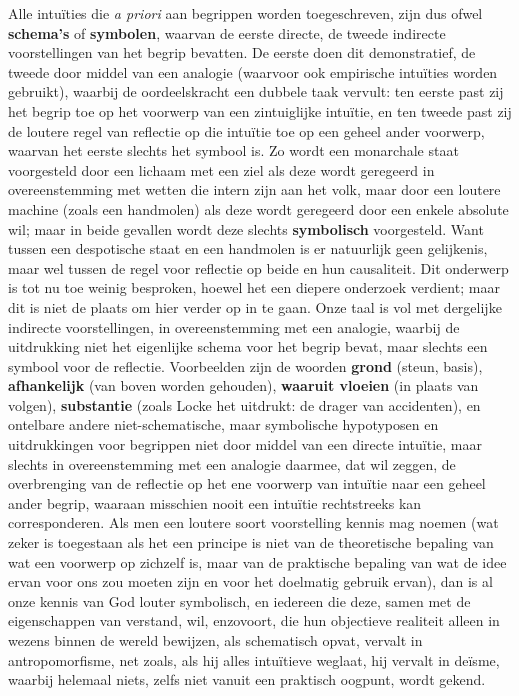 Alle intuïties die \textit{a priori} aan begrippen worden toegeschreven, zijn dus ofwel \textbf{schema's} of \textbf{symbolen}, waarvan de eerste directe, de tweede indirecte voorstellingen van het begrip bevatten. De eerste doen dit demonstratief, de tweede door middel van een analogie (waarvoor ook empirische intuïties worden gebruikt), waarbij de oordeelskracht een dubbele taak vervult: ten eerste past zij het begrip toe op het voorwerp van een zintuiglijke intuïtie, en ten tweede past zij de loutere regel van reflectie op die intuïtie toe op een geheel ander voorwerp, waarvan het eerste slechts het symbool is. Zo wordt een monarchale staat voorgesteld door een lichaam met een ziel als deze wordt geregeerd in overeenstemming met wetten die intern zijn aan het volk, maar door een loutere machine (zoals een handmolen) als deze wordt geregeerd door een enkele absolute wil; maar in beide gevallen wordt deze slechts \textbf{symbolisch} voorgesteld. Want tussen een despotische staat en een handmolen is er natuurlijk geen gelijkenis, maar wel tussen de regel voor reflectie op beide en hun causaliteit. Dit onderwerp is tot nu toe weinig besproken, hoewel het een diepere onderzoek verdient; maar dit is niet de plaats om hier verder op in te gaan. Onze taal is vol met dergelijke indirecte voorstellingen, in overeenstemming met een analogie, waarbij de uitdrukking niet het eigenlijke schema voor het begrip bevat, maar slechts een symbool voor de reflectie. Voorbeelden zijn de woorden \textbf{grond} (steun, basis), \textbf{afhankelijk} (van boven worden gehouden), \textbf{waaruit vloeien} (in plaats van volgen), \textbf{substantie} (zoals Locke het uitdrukt: de drager van accidenten), en ontelbare andere niet-schematische, maar symbolische hypotyposen en uitdrukkingen voor begrippen niet door middel van een directe intuïtie, maar slechts in overeenstemming met een analogie daarmee, dat wil zeggen, de overbrenging van de reflectie op het ene voorwerp van intuïtie naar een geheel ander begrip, waaraan misschien nooit een intuïtie rechtstreeks kan corresponderen. Als men een loutere soort voorstelling kennis mag noemen (wat zeker is toegestaan als het een principe is niet van de theoretische bepaling van wat een voorwerp op zichzelf is, maar van de praktische bepaling van wat de idee ervan voor ons zou moeten zijn en voor het doelmatig gebruik ervan), dan is al onze kennis van God louter symbolisch, en iedereen die deze, samen met de eigenschappen van verstand, wil, enzovoort, die hun objectieve realiteit alleen in wezens binnen de wereld bewijzen, als schematisch opvat, vervalt in antropomorfisme, net zoals, als hij alles intuïtieve weglaat, hij vervalt in deïsme, waarbij helemaal niets, zelfs niet vanuit een praktisch oogpunt, wordt gekend.

